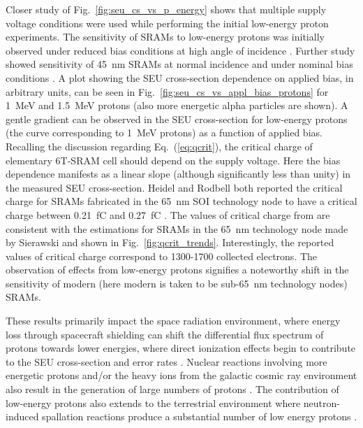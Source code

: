 Closer study of Fig.~\ref{fig:seu_cs_vs_p_energy} shows that multiple supply voltage conditions were used while performing the initial low-energy proton experiments.
The sensitivity of SRAMs to low-energy protons was initially observed under reduced bias conditions at high angle of incidence \cite{Heidel:2006tp}.
Further study showed sensitivity of 45~nm SRAMs at normal incidence and under nominal bias conditions \cite{Rodbell:2007vl,Heidel:2009vx}.
A plot showing the SEU cross-section dependence on applied bias, in arbitrary units, can be seen in Fig.~\ref{fig:seu_cs_vs_appl_bias_protons} for 1~MeV and 1.5~MeV protons (also more energetic alpha particles are shown).
A gentle gradient can be observed in the SEU cross-section for low-energy protons (the curve corresponding to 1~MeV protons) as a function of applied bias.
Recalling the discussion regarding Eq.~(\ref{eq:qcrit}), the critical charge of elementary 6T-SRAM cell should depend on the supply voltage.
Here the bias dependence manifests as a linear slope (although significantly less than unity) in the measured SEU cross-section.
Heidel and Rodbell both reported the critical charge for SRAMs fabricated in the 65~nm SOI technology node to have a critical charge between 0.21~fC and 0.27~fC \cite{Heidel:2006tp,Rodbell:2007vl}.
The values of critical charge from \cite{Heidel:2006tp,Rodbell:2007vl} are consistent with the estimations for SRAMs in the 65~nm technology node made by Sierawski and shown in Fig.~\ref{fig:qcrit_trends}.
Interestingly, the reported values of critical charge correspond to 1300-1700 collected electrons.
The observation of effects from low-energy protons signifies a noteworthy shift in the sensitivity of modern (here modern is taken to be sub-65~nm technology nodes) SRAMs.

These results primarily impact the space radiation environment, where energy loss through spacecraft shielding can shift the differential flux spectrum of protons towards lower energies, where direct ionization effects begin to contribute to the SEU cross-section and error rates \cite{Sierawski:2009ka}.
Nuclear reactions involving more energetic protons and/or the heavy ions from the galactic cosmic ray environment also result in the generation of large numbers of protons \cite{Rodbell:2007vl}.
The contribution of low-energy protons also extends to the terrestrial environment where neutron-induced spallation reactions produce a substantial number of low energy protons \cite{Rodbell:2007vl}.

